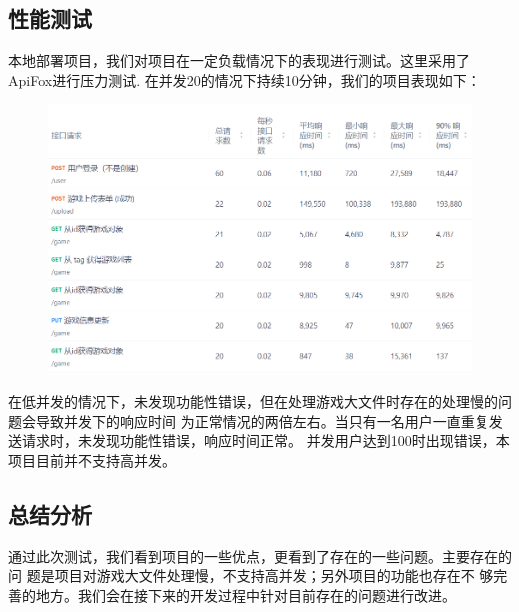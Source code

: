\documentclass[12pt]{ctexart} %
\begin{document}
\subsection{性能测试}
本地部署项目，我们对项目在一定负载情况下的表现进行测试。这里采用了ApiFox进行压力测试.
在并发20的情况下持续10分钟，我们的项目表现如下：
\begin{figure}[htbp]
  \centering 
  \includegraphics[width=1\textwidth]{test1.png}
\end{figure}

在低并发的情况下，未发现功能性错误，但在处理游戏大文件时存在的处理慢的问题会导致并发下的响应时间
为正常情况的两倍左右。当只有一名用户一直重复发送请求时，未发现功能性错误，响应时间正常。
并发用户达到100时出现错误，本项目目前并不支持高并发。

\subsection{总结分析}
通过此次测试，我们看到项目的一些优点，更看到了存在的一些问题。主要存在的问
题是项目对游戏大文件处理慢，不支持高并发；另外项目的功能也存在不
够完善的地方。我们会在接下来的开发过程中针对目前存在的问题进行改进。
\end{document}
